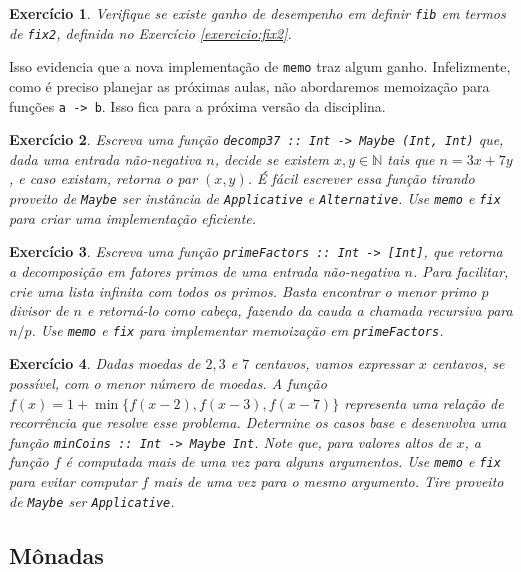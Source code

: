 \documentclass[a4paper]{article}
\newtheorem{exercicio}{Exercício}
\begin{document}
\begin{exercicio}
	Verifique se existe ganho de desempenho em definir \emph{\texttt{fib}} em termos de \emph{\texttt{fix2}}, definida no Exercício \ref{exercicio:fix2}.
\end{exercicio}

Isso evidencia que a nova implementação de \texttt{memo} traz algum ganho.
Infelizmente, como é preciso planejar as próximas aulas, não abordaremos memoização para funções \texttt{a -> b}.
Isso fica para a próxima versão da disciplina.

\begin{exercicio}
	Escreva uma função \emph{\texttt{decomp37 :: Int -> Maybe (Int, Int)}} que, dada uma entrada não-negativa $n$, decide se existem $x, y \in \mathbb{N}$ tais que $n = 3x + 7y$, e caso existam, retorna o par $(x, y)$.
	É fácil escrever essa função tirando proveito de \emph{\texttt{Maybe}} ser instância de \emph{\texttt{Applicative}} e \emph{\texttt{Alternative}}.
	Use \emph{\texttt{memo}} e \emph{\texttt{fix}} para criar uma implementação eficiente.
\end{exercicio}

\begin{exercicio}
	Escreva uma função \emph{\texttt{primeFactors :: Int -> [Int]}}, que retorna a decomposição em fatores primos de uma entrada não-negativa $n$.
	Para facilitar, crie uma lista infinita com todos os primos.
	Basta encontrar o menor primo $p$ divisor de $n$ e retorná-lo como cabeça, fazendo da cauda a chamada recursiva para $n / p$.
	Use \emph{\texttt{memo}} e \emph{\texttt{fix}} para implementar memoização em \emph{\texttt{primeFactors}}.
\end{exercicio}

\begin{exercicio}
	Dadas moedas de $2, 3$ e $7$ centavos, vamos expressar $x$ centavos, se possível, com o menor número de moedas.
	A função \mbox{$f(x) = 1 + \min \{f(x - 2), f(x - 3), f(x - 7)\}$} representa uma relação de recorrência que resolve esse problema.
	Determine os casos base e desenvolva uma função \emph{\texttt{minCoins :: Int -> Maybe Int}}.
	Note que, para valores altos de $x$, a função $f$ é computada mais de uma vez para alguns argumentos.
	Use \emph{\texttt{memo}} e \emph{\texttt{fix}} para evitar computar $f$ mais de uma vez para o mesmo argumento.
	Tire proveito de \emph{\texttt{Maybe}} ser \emph{\texttt{Applicative}}.
\end{exercicio}

\subsection{Mônadas}
\end{document}
